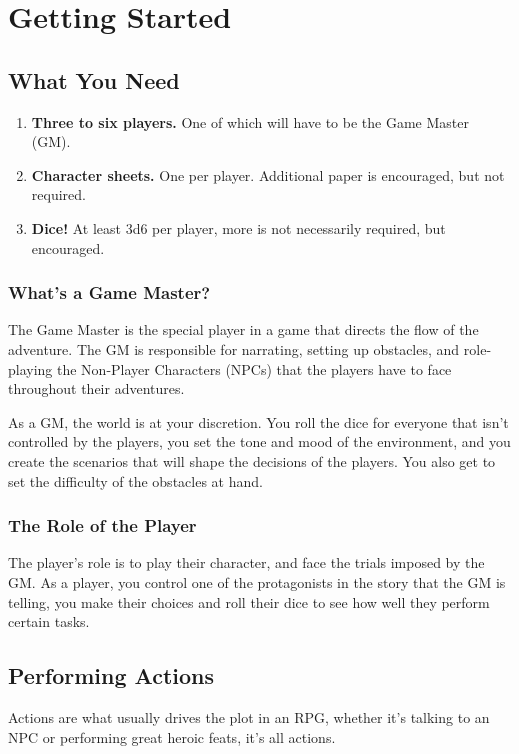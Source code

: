 \chapter{Getting Started}
\section{What You Need}
\begin{enumerate}
    \item \textbf{Three to six players.} One of which will have to be the Game Master (GM).
    \item \textbf{Character sheets.} One per player. Additional paper is encouraged, but not required.
    \item \textbf{Dice!} At least 3d6 per player, more is not necessarily required, but encouraged.
\end{enumerate}

\subsection{What's a Game Master?}
The Game Master is the special player in a game that directs the flow of the adventure.
The GM is responsible for narrating, setting up obstacles, and role-playing the Non-Player Characters (NPCs) that the players have to face throughout their adventures.

As a GM, the world is at your discretion. 
You roll the dice for everyone that isn't controlled by the players, you set the tone and mood of the environment, and you create the scenarios that will shape the decisions of the players.
You also get to set the difficulty of the obstacles at hand.

\subsection{The Role of the Player}
The player's role is to play their character, and face the trials imposed by the GM.
As a player, you control one of the protagonists in the story that the GM is telling, you make their choices and roll their dice to see how well they perform certain tasks.

\section{Performing Actions}
Actions are what usually drives the plot in an RPG, whether it's talking to an NPC or performing great heroic feats, it's all actions.

